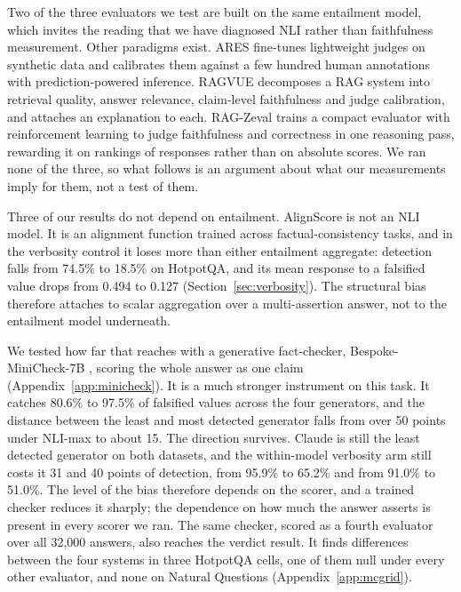 \label{sec:beyond-nli}

Two of the three evaluators we test are built on the same entailment model, which invites the reading that we have diagnosed NLI rather than faithfulness measurement. Other paradigms exist. ARES \citep{saad-falcon-etal-2024} fine-tunes lightweight judges on synthetic data and calibrates them against a few hundred human annotations with prediction-powered inference. RAGVUE \citep{murugaraj-etal-2026} decomposes a RAG system into retrieval quality, answer relevance, claim-level faithfulness and judge calibration, and attaches an explanation to each. RAG-Zeval \citep{li-etal-2025-rag} trains a compact evaluator with reinforcement learning to judge faithfulness and correctness in one reasoning pass, rewarding it on rankings of responses rather than on absolute scores. We ran none of the three, so what follows is an argument about what our measurements imply for them, not a test of them.

Three of our results do not depend on entailment. AlignScore is not an NLI model. It is an alignment function trained across factual-consistency tasks, and in the verbosity control it loses more than either entailment aggregate: detection falls from 74.5\% to 18.5\% on HotpotQA, and its mean response to a falsified value drops from 0.494 to 0.127 (Section~\ref{sec:verbosity}). The structural bias therefore attaches to scalar aggregation over a multi-assertion answer, not to the entailment model underneath.

We tested how far that reaches with a generative fact-checker, Bespoke-MiniCheck-7B \citep{tang-etal-2024}, scoring the whole answer as one claim (Appendix~\ref{app:minicheck}). It is a much stronger instrument on this task. It catches 80.6\% to 97.5\% of falsified values across the four generators, and the distance between the least and most detected generator falls from over 50 points under NLI-max to about 15. The direction survives. Claude is still the least detected generator on both datasets, and the within-model verbosity arm still costs it 31 and 40 points of detection, from 95.9\% to 65.2\% and from 91.0\% to 51.0\%. The level of the bias therefore depends on the scorer, and a trained checker reduces it sharply; the dependence on how much the answer asserts is present in every scorer we ran. The same checker, scored as a fourth evaluator over all 32,000 answers, also reaches the verdict result. It finds differences between the four systems in three HotpotQA cells, one of them null under every other evaluator, and none on Natural Questions (Appendix~\ref{app:mcgrid}).

